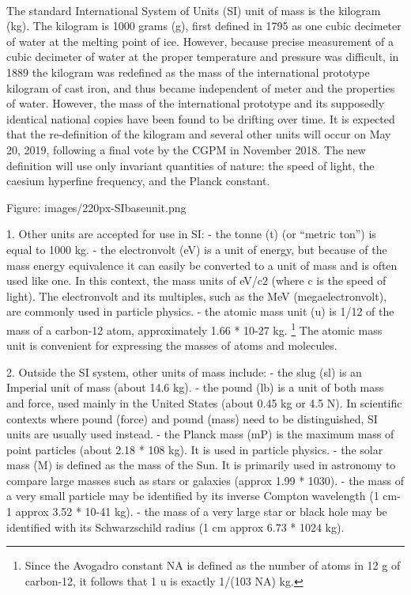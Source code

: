 \documentclass{book}
\begin{document}
	\paragraph{}
	The standard International System of Units (SI) unit of mass is the kilogram (kg). The kilogram is 1000 grams (g), first defined in 1795 as one cubic decimeter of water at the melting point of ice. However, because precise measurement of a cubic decimeter of water at the proper temperature and pressure was difficult, in 1889 the kilogram was redefined as the mass of the international prototype kilogram of cast iron, and thus became independent of meter and the properties of water. However, the mass of the international prototype and its supposedly identical national copies have been found to be drifting over time. It is expected that the re-definition of the kilogram and several other units will occur on May 20, 2019, following a final vote by the CGPM in November 2018. The new definition will use only invariant quantities of nature: the speed of light, the caesium hyperfine frequency, and the Planck constant.
	
	Figure: images/220px-SIbaseunit.png
	
	1. Other units are accepted for use in SI: - the tonne (t) (or ``metric ton'') is equal to 1000 kg. - the electronvolt (eV) is a unit of energy, but because of the mass energy equivalence it can easily be converted to a unit of mass and is often used like one. In this context, the mass units of eV/c2 (where c is the speed of light). The electronvolt and its multiples, such as the MeV (megaelectronvolt), are commonly used in particle physics. - the atomic mass unit (u) is 1/12 of the mass of a carbon-12 atom, approximately 1.66 * 10-27 kg. \footnote{Since the Avogadro constant NA is defined as the number of atoms in 12 g of carbon-12, it follows that 1 u is exactly 1/(103 NA) kg.} The atomic mass unit is convenient for expressing the masses of atoms and molecules.
	
	2. Outside the SI system, other units of mass include: - the slug (sl) is an Imperial unit of mass (about 14.6 kg). - the pound (lb) is a unit of both mass and force, used mainly in the United States (about 0.45 kg or 4.5 N). In scientific contexts where pound (force) and pound (mass) need to be distinguished, SI units are usually used instead. - the Planck mass (mP) is the maximum mass of point particles (about 2.18 * 108 kg). It is used in particle physics. - the solar mass (M) is defined as the mass of the Sun. It is primarily used in astronomy to compare large masses such as stars or galaxies (approx 1.99 * 1030). - the mass of a very small particle may be identified by its inverse Compton wavelength (1 cm-1 approx 3.52 * 10-41 kg). - the mass of a very large star or black hole may be identified with its Schwarzschild radius (1 cm approx 6.73 * 1024 kg).
	
\end{document}
